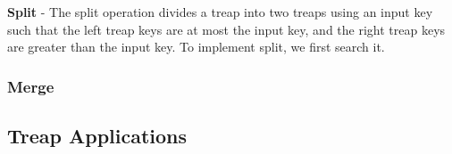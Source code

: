 \noindent \textbf{Split} - The split operation divides a treap into two treaps using an input key such that the left treap keys are at most the input key, and the right treap keys are greater than the input key. To implement split, we first search it.
\subsubsection{Merge}

\subsection{Treap Applications}



